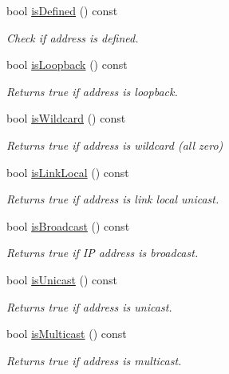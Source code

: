 \begin{DoxyCompactItemize}
bool \hyperlink{classlibrary_1_1io_1_1ip_1_1_address_adb0cb92c138c3aa983ce007318cca1a8}{is\+Defined} () const
\begin{DoxyCompactList}\small\item\em Check if address is defined. \end{DoxyCompactList}\item 
bool \hyperlink{classlibrary_1_1io_1_1ip_1_1_address_abd441207de67b876bafecca7ac1e70b1}{is\+Loopback} () const
\begin{DoxyCompactList}\small\item\em Returns true if address is loopback. \end{DoxyCompactList}\item 
bool \hyperlink{classlibrary_1_1io_1_1ip_1_1_address_a228663b61e067424cceedc640ae44bb8}{is\+Wildcard} () const
\begin{DoxyCompactList}\small\item\em Returns true if address is wildcard (all zero) \end{DoxyCompactList}\item 
bool \hyperlink{classlibrary_1_1io_1_1ip_1_1_address_a871a9947ce8e5e84a8e3e26e80f7ddec}{is\+Link\+Local} () const
\begin{DoxyCompactList}\small\item\em Returns true if address is link local unicast. \end{DoxyCompactList}\item 
bool \hyperlink{classlibrary_1_1io_1_1ip_1_1_address_ac82a4af0af42e2ddc02fe2fc7c9593e5}{is\+Broadcast} () const
\begin{DoxyCompactList}\small\item\em Returns true if IP address is broadcast. \end{DoxyCompactList}\item 
bool \hyperlink{classlibrary_1_1io_1_1ip_1_1_address_af01a1e2adfd5233077ca1031ed289806}{is\+Unicast} () const
\begin{DoxyCompactList}\small\item\em Returns true if address is unicast. \end{DoxyCompactList}\item 
bool \hyperlink{classlibrary_1_1io_1_1ip_1_1_address_a4571470091447ac28652f072708a2cea}{is\+Multicast} () const
\begin{DoxyCompactList}\small\item\em Returns true if address is multicast. \end{DoxyCompactList}\item 

\end{DoxyCompactItemize}
